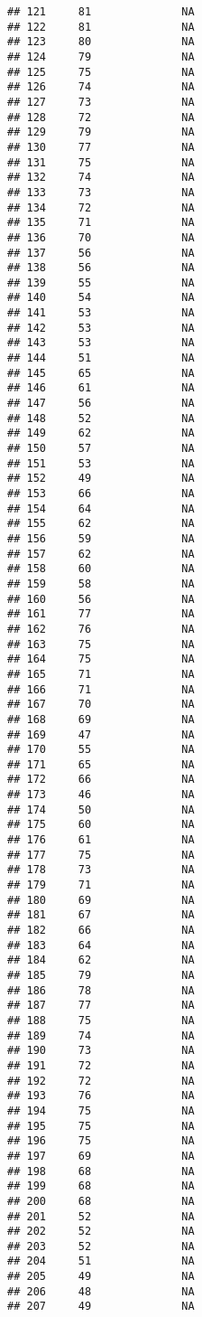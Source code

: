 \documentclass[]{article}
\begin{document}
\begin{verbatim}
## 121     81              NA
## 122     81              NA
## 123     80              NA
## 124     79              NA
## 125     75              NA
## 126     74              NA
## 127     73              NA
## 128     72              NA
## 129     79              NA
## 130     77              NA
## 131     75              NA
## 132     74              NA
## 133     73              NA
## 134     72              NA
## 135     71              NA
## 136     70              NA
## 137     56              NA
## 138     56              NA
## 139     55              NA
## 140     54              NA
## 141     53              NA
## 142     53              NA
## 143     53              NA
## 144     51              NA
## 145     65              NA
## 146     61              NA
## 147     56              NA
## 148     52              NA
## 149     62              NA
## 150     57              NA
## 151     53              NA
## 152     49              NA
## 153     66              NA
## 154     64              NA
## 155     62              NA
## 156     59              NA
## 157     62              NA
## 158     60              NA
## 159     58              NA
## 160     56              NA
## 161     77              NA
## 162     76              NA
## 163     75              NA
## 164     75              NA
## 165     71              NA
## 166     71              NA
## 167     70              NA
## 168     69              NA
## 169     47              NA
## 170     55              NA
## 171     65              NA
## 172     66              NA
## 173     46              NA
## 174     50              NA
## 175     60              NA
## 176     61              NA
## 177     75              NA
## 178     73              NA
## 179     71              NA
## 180     69              NA
## 181     67              NA
## 182     66              NA
## 183     64              NA
## 184     62              NA
## 185     79              NA
## 186     78              NA
## 187     77              NA
## 188     75              NA
## 189     74              NA
## 190     73              NA
## 191     72              NA
## 192     72              NA
## 193     76              NA
## 194     75              NA
## 195     75              NA
## 196     75              NA
## 197     69              NA
## 198     68              NA
## 199     68              NA
## 200     68              NA
## 201     52              NA
## 202     52              NA
## 203     52              NA
## 204     51              NA
## 205     49              NA
## 206     48              NA
## 207     49              NA

\end{verbatim}
\end{document}
